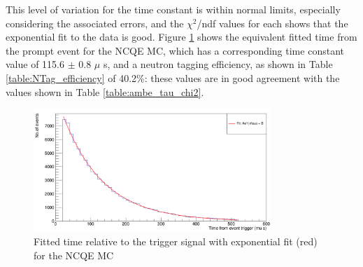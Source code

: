 This level of variation for the time constant is within normal limits, especially considering the associated errors, and the $\chi^{2}$/ndf values for each shows that the exponential fit to the data is good. Figure \ref{fig:MC_time_constant} shows the equivalent fitted time from the prompt event for the NCQE MC, which has a corresponding time constant value of 115.6 $\pm$ 0.8 $\mu$ s, and a neutron tagging efficiency, as shown in Table \ref{table:NTag_efficiency} of 40.2\%: these values are in good agreement with the values shown in Table \ref{table:ambe_tau_chi2}. 

\begin{figure}
    \centering
    \includegraphics[width=0.8\textwidth]{Figures/MC_fitT.png}
    \caption{Fitted time relative to the trigger signal with exponential fit (red) for the NCQE MC}
    \label{fig:MC_time_constant}
\end{figure}



